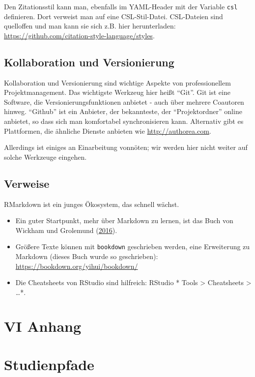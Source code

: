 \documentclass[12pt,]{book}
\begin{document}
Den Zitationsstil kann man, ebenfalls im YAML-Header mit der Variable
\texttt{csl} definieren. Dort verweist man auf eine CSL-Stil-Datei.
CSL-Dateien sind quelloffen und man kann sie sich z.B. hier
herunterladen: \url{https://github.com/citation-style-language/styles}.

\section{Kollaboration und
Versionierung}\label{kollaboration-und-versionierung}

Kollaboration und Versionierung sind wichtige Aspekte von
professionellem Projektmanagement. Das wichtigste Werkzeug hier heißt
``Git''. Git ist eine Software, die Versionierungsfunktionen anbietet -
auch über mehrere Coautoren hinweg. ``Github'' ist ein Anbieter, der
bekannteste, der ``Projektordner'' online anbietet, so dass sich man
komfortabel synchronisieren kann. Alternativ gibt es Plattformen, die
ähnliche Dienste anbieten wie \url{http://authorea.com}.

Allerdings ist einiges an Einarbeitung vonnöten; wir werden hier nicht
weiter auf solche Werkzeuge eingehen.

\section{Verweise}\label{verweise-6}

RMarkdown ist ein junges Ökosystem, das schnell wächst.

\begin{itemize}
\item
  Ein guter Startpunkt, mehr über Markdown zu lernen, ist das Buch von
  Wickham und Grolemund (\protect\hyperlink{ref-r4ds}{2016}).
\item
  Größere Texte können mit \texttt{bookdown} geschrieben werden, eine
  Erweiterung zu Markdown (dieses Buch wurde so geschrieben):
  \url{https://bookdown.org/yihui/bookdown/}
\item
  Die Cheatsheets von RStudio sind hilfreich: RStudio * Tools
  \textgreater{} Cheatsheets \textgreater{} \ldots{}*.
\end{itemize}

\chapter*{VI Anhang}\label{vi-anhang}


\chapter{Studienpfade}\label{studienpfade}
\end{document}
